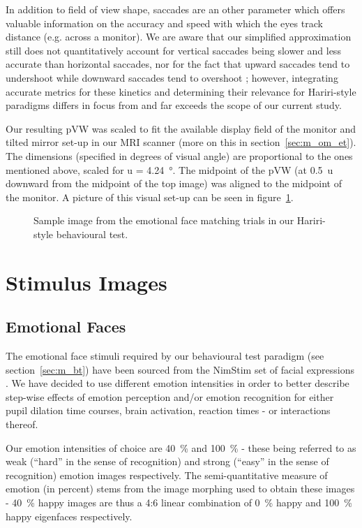 	In addition to field of view shape, saccades are an other parameter which offers valuable information on the accuracy and speed with which the eyes track distance (e.g. across a monitor).
	We are aware that our simplified approximation still does not quantitatively account for vertical saccades being slower \citep{TerryBahill1975} and less accurate \citep{Collewijn1988} than horizontal saccades, 
	nor for the fact that upward saccades tend to undershoot while downward saccades tend to overshoot \citep{Collewijn1988};
	however, integrating accurate metrics for these kinetics and determining their relevance for Hariri-style paradigms differs in focus from and far exceeds the scope of our current study.
	
	Our resulting pVW was scaled to fit the available display field of the monitor and tilted mirror set-up in our MRI scanner (more on this in section~\ref{sec:m_om_et}).
	The dimensions (specified in degrees of visual angle) are proportional to the ones mentioned above, scaled for u = \SI{4.24}{\degree}.
	The midpoint of the pVW (at \SI{0.5}{u} downward from the midpoint of the top image) was aligned to the midpoint of the monitor.
	A picture of this visual set-up can be seen in figure~\ref{fig:m_b_2}.
	
	\begin{figure}[!h]
	    \caption{Sample image from the emotional face matching trials in our Hariri-style behavioural test.}
	    \label{fig:m_b_2}
	\end{figure}
		    
    \section{Stimulus Images}
	\subsection{Emotional Faces}\label{sec:m_vs_ef}
	    The emotional face stimuli required by our behavioural test paradigm (see section~\ref{sec:m_bt}) have been sourced from the NimStim set of facial expressions \citep{Tottenham2009}.
	    We have decided to use different emotion intensities in order to better describe step-wise effects of emotion perception and/or emotion recognition for either pupil dilation time courses, brain activation, reaction times - or interactions thereof.
	    
	    Our emotion intensities of choice are \SI{40}{\percent} and \SI{100}{\percent} - these being referred to as weak (“hard” in the sense of recognition) and strong (“easy” in the sense of recognition) emotion images respectively.
	    The semi-quantitative measure of emotion (in percent) stems from the image morphing used to obtain these images - \SI{40}{\percent} happy images are thus a 4:6 linear combination of \SI{0}{\percent} happy and \SI{100}{\percent} happy eigenfaces \citep{Zhang2008} respectively.
	    
